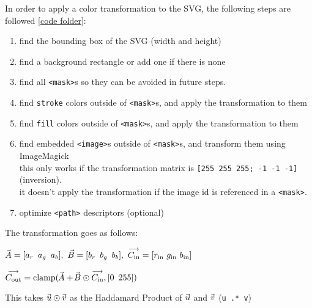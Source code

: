 \documentclass[12pt]{article}
\newcommand \hpx [1]{\hspace{#1px}}
\newcommand \nhpx [1]{\hspace{-#1px}}
\newcommand \Avec {\!\nhpx{-0.5}\vec{\hpx{0.5}A}}
\newcommand \Bvec {\nhpx{1.5}\vec{\hpx{0.3}B}}
\newcommand \uvec {\nhpx 1 \vec{\hpx 1 u}}
\newcommand \vvec {\nhpx 1 \vec{\hpx 1 v}}
\begin{document}
In order to apply a color transformation to the SVG, the following steps are followed \ref{code folder}:
\begin{enumerate}
	\item \vspace{-0.5em} find the bounding box of the SVG (width and height)
	\item \vspace{-0.5em} find a background rectangle or add one if there is none
	\item \vspace{-0.5em} find all \texttt{<mask>}s so they can be avoided in future steps.
	\item \vspace{-0.5em} find \texttt{stroke} colors outside of \texttt{<mask>}s, and apply the transformation to them
	\item \vspace{-0.5em} find \texttt{fill} colors outside of \texttt{<mask>}s, and apply the transformation to them
	\item \vspace{-0.5em} find embedded \texttt{<image>}s outside of \texttt{<mask>}s, and transform them using ImageMagick\\
		this only works if the transformation matrix is \texttt{[255 255 255; -1 -1 -1]} (inversion).\\
		it doesn't apply the transformation if the image id is referenced in a \texttt{<mask>}.
	\item \vspace{-0.5em} optimize \texttt{<path>} descriptors (optional)
\end{enumerate}

\pagebreak\restoregeometry

\noindent The transformation goes as follows:

$\Avec = [a_r ~\, a_g ~\, a_b],~\vec B = [b_r ~\, b_g ~\, b_b],~\overset{\text{\raisebox{-0.5px}{$\longrightarrow$}}}{C_{\text{in}}} = [r_{\text{in}} ~ g_{\text{in}} ~ b_{\text{in}}]$

$\overset{\text{\raisebox{-0.5px}{$\longrightarrow$}}}{C_{\text{out}}} = \text{clamp}(\Avec + \Bvec \odot \overset{\text{\raisebox{-0.5px}{$\longrightarrow$}}}{C_{\text{in}}}, [0 ~\, 255])$

\noindent This takes $\uvec \odot \vvec$ as the Haddamard Product of $\uvec$ and $\vvec$ (\texttt{\textcolor{variable}u \textcolor{operator}{.*} \textcolor{variable}v})
\vspace{5px}
\end{document}

